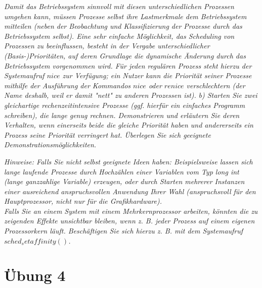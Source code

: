 \documentclass[a4paper]{article}
\begin{document}
\textit{Damit das Betriebssystem sinnvoll mit diesen unterschiedlichen Prozessen umgehen kann, müssen Prozesse selbst ihre Lastmerkmale dem Betriebssystem mitteilen (neben der Beobachtung und Klassifizierung der Prozesse durch das Betriebssystem selbst). Eine sehr einfache Möglichkeit, das Scheduling von Prozessen zu beeinflussen, besteht in der Vergabe unterschiedlicher (Basis-)Prioritäten, auf deren Grundlage die dynamische Änderung durch das Betriebssystem vorgenommen wird. Für jeden regulären Prozess steht hierzu der Systemaufruf $nice$ zur Verfügung; ein Nutzer kann die Priorität seiner Prozesse mithilfe der Ausführung
    der Kommandos $nice$ oder $renice$ verschlechtern (der Name deshalb, weil er damit "nett" zu anderen Prozessen ist).}
\vspace{10mm}
\textit{b) Starten Sie zwei gleichartige rechenzeitintensive Prozesse (ggf. hierfür ein einfaches Programm schreiben), die lange genug rechnen. Demonstrieren und erläutern Sie deren Verhalten, wenn einerseits beide die gleiche Priorität haben und andererseits ein Prozess seine Priorität verringert hat. Überlegen Sie sich geeignete Demonstrationsmöglichkeiten.}
\vspace{10mm}

\textit{
    Hinweise:
    Falls Sie nicht selbst geeignete Ideen haben: Beispielsweise lassen sich lange laufende Prozesse durch Hochzählen einer Variablen vom Typ long int (lange ganzzahlige Variable) erzeugen, oder durch Starten mehrerer Instanzen einer ausreichend anspruchsvollen Anwendung Ihrer Wahl (anspruchsvoll für den Hauptprozessor, nicht nur für die Grafikhardware).\\
    Falls Sie an einem System mit einem Mehrkernprozessor arbeiten, könnten die zu zeigenden Effekte unsichtbar bleiben, wenn z. B. jeder Prozess auf einem eigenen Prozessorkern läuft. Beschäftigen Sie sich hierzu z. B. mit dem Systemaufruf $sched_setaffinity()$.
}
\vspace{10mm}


\newpage
\section{Übung 4}
\end{document}
